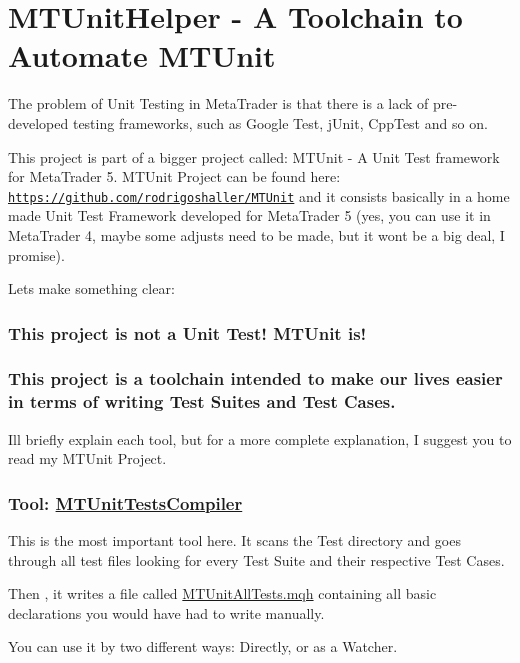 \section*{M\+T\+Unit\+Helper -\/ A Toolchain to Automate M\+T\+Unit}

The problem of Unit Testing in Meta\+Trader is that there is a lack of pre-\/developed testing frameworks, such as Google Test, j\+Unit, Cpp\+Test and so on.

This project is part of a bigger project called\+: M\+T\+Unit -\/ A Unit Test framework for Meta\+Trader 5. M\+T\+Unit Project can be found here\+: \href{https://github.com/rodrigoshaller/MTUnit}{\tt https\+://github.\+com/rodrigoshaller/\+M\+T\+Unit} and it consists basically in a home made Unit Test Framework developed for Meta\+Trader 5 (yes, you can use it in Meta\+Trader 4, maybe some adjusts need to be made, but it won\textquotesingle{}t be a big deal, I promise).

Let\textquotesingle{}s make something clear\+: \subsubsection*{This project is not a Unit Test! M\+T\+Unit is!}

\subsubsection*{This project is a toolchain intended to make our lives easier in terms of writing Test Suites and Test Cases.}

I\textquotesingle{}ll briefly explain each tool, but for a more complete explanation, I suggest you to read my M\+T\+Unit Project.

\subsubsection*{Tool\+: \mbox{\hyperlink{class_m_t_unit_tests_compiler}{M\+T\+Unit\+Tests\+Compiler}}}

This is the most important tool here. It scans the Test directory and goes through all test files looking for every Test Suite and their respective Test Cases.

Then , it writes a file called \mbox{\hyperlink{_m_t_unit_all_tests_8mqh}{M\+T\+Unit\+All\+Tests.\+mqh}} containing all basic declarations you would have had to write manually.

You can use it by two different ways\+: Directly, or as a Watcher.

